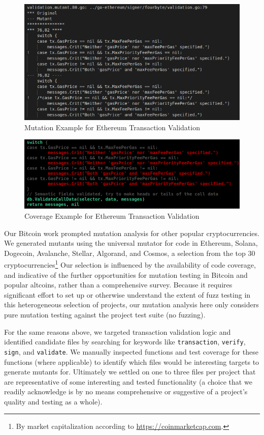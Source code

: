 \begin{figure}
\vspace{2mm}
\includegraphics[width=0.9\columnwidth]{mutation-example.png}
\caption{Mutation Example for Ethereum Transaction Validation}
\label{fig:mutation}
\end{figure}

\begin{figure}
\vspace{2mm}
\includegraphics[width=0.9\columnwidth]{coverage-example.png}
\caption{Coverage Example for Ethereum Transaction Validation}
\label{fig:coverage}
\end{figure}

Our Bitcoin work prompted mutation analysis for other popular cryptocurrencies.
We generated mutants using the universal mutator for code in Ethereum, Solana,
Dogecoin, Avalanche, Stellar, Algorand, and Cosmos, a selection from the top 30
cryptocurrencies\footnote{By market capitalization according to
\url{https://coinmarketcap.com}.} Our selection is influenced by the
availability of code coverage, and indicative of the further opportunities for
mutation testing in Bitcoin and popular altcoins, rather than a
comprehensive survey. Because it requires significant effort to set up or
otherwise understand the extent of fuzz testing in this heterogeneous selection
of projects, our mutation analysis here only considers pure mutation testing
against the project test suite (no fuzzing).

For the same reasons above, we targeted transaction validation logic and
identified candidate files by searching for keywords like \texttt{transaction},
\texttt{verify}, \texttt{sign}, and \texttt{validate}. We manually inspected
functions and test coverage for these functions (where applicable) to identify
which files would be interesting targets to generate mutants for. Ultimately we
settled on one to three files per project that are representative of some
interesting and tested functionality (a choice that we readily acknowledge is by
no means comprehensive or suggestive of a project's quality and testing as a
whole).

